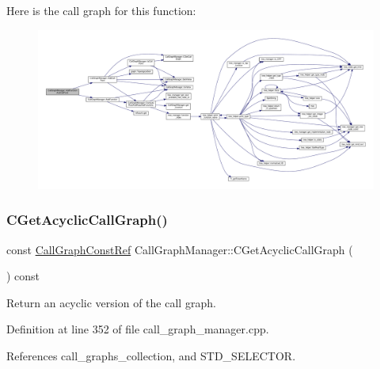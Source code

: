 Here is the call graph for this function\+:
\nopagebreak
\begin{figure}[H]
\begin{center}
\leavevmode
\includegraphics[width=350pt]{d5/d96/classCallGraphManager_ae1a2605dc9eb6b7259205aff1289b224_cgraph}
\end{center}
\end{figure}
\mbox{\label{classCallGraphManager_a96c4ad4f6de2cc316df5bb28523e2d29}} 
\subsubsection{\texorpdfstring{C\+Get\+Acyclic\+Call\+Graph()}{CGetAcyclicCallGraph()}}
{\footnotesize\ttfamily const \hyperlink{call__graph_8hpp_a6effd75e39674b4777714051b70eddf2}{Call\+Graph\+Const\+Ref} Call\+Graph\+Manager\+::\+C\+Get\+Acyclic\+Call\+Graph (\begin{DoxyParamCaption}{ }\end{DoxyParamCaption}) const}



Return an acyclic version of the call graph. 



Definition at line 352 of file call\+\_\+graph\+\_\+manager.\+cpp.



References call\+\_\+graphs\+\_\+collection, and S\+T\+D\+\_\+\+S\+E\+L\+E\+C\+T\+OR.

\mbox{\label{classCallGraphManager_ab9bcffba4526d85c1b3b915905b9356c}} 
